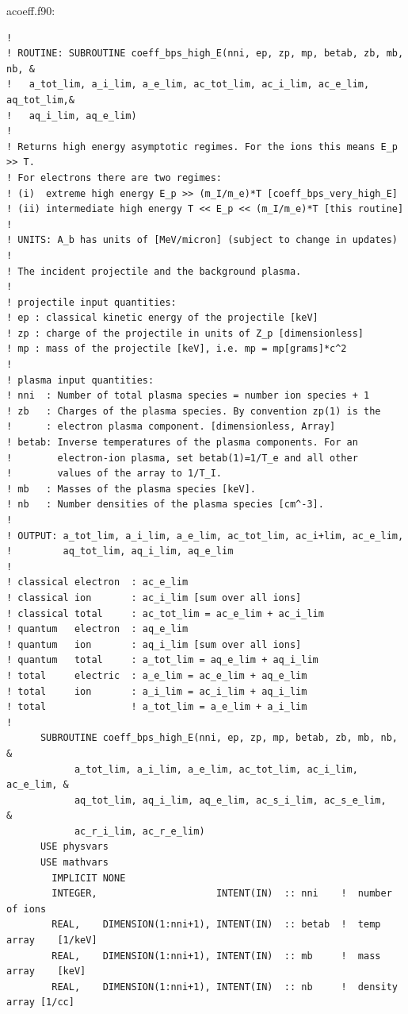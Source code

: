 \documentclass[preprint,12pt,eqsecnum,nofootinbib,amsmath,amssymb]{revtex4}
\begin{document}
\vskip1cm
\noindent
acoeff.f90:
{
\baselineskip 10pt
\begin{verbatim}
! 
! ROUTINE: SUBROUTINE coeff_bps_high_E(nni, ep, zp, mp, betab, zb, mb, nb, &
!   a_tot_lim, a_i_lim, a_e_lim, ac_tot_lim, ac_i_lim, ac_e_lim, aq_tot_lim,&
!   aq_i_lim, aq_e_lim)
!
! Returns high energy asymptotic regimes. For the ions this means E_p >> T.
! For electrons there are two regimes: 
! (i)  extreme high energy E_p >> (m_I/m_e)*T [coeff_bps_very_high_E]
! (ii) intermediate high energy T << E_p << (m_I/m_e)*T [this routine]
!
! UNITS: A_b has units of [MeV/micron] (subject to change in updates)
!
! The incident projectile and the background plasma. 
!
! projectile input quantities:
! ep : classical kinetic energy of the projectile [keV]
! zp : charge of the projectile in units of Z_p [dimensionless]
! mp : mass of the projectile [keV], i.e. mp = mp[grams]*c^2
!
! plasma input quantities:
! nni  : Number of total plasma species = number ion species + 1
! zb   : Charges of the plasma species. By convention zp(1) is the 
!      : electron plasma component. [dimensionless, Array]
! betab: Inverse temperatures of the plasma components. For an
!        electron-ion plasma, set betab(1)=1/T_e and all other
!        values of the array to 1/T_I.
! mb   : Masses of the plasma species [keV]. 
! nb   : Number densities of the plasma species [cm^-3]. 
!
! OUTPUT: a_tot_lim, a_i_lim, a_e_lim, ac_tot_lim, ac_i+lim, ac_e_lim, 
!         aq_tot_lim, aq_i_lim, aq_e_lim
!
! classical electron  : ac_e_lim
! classical ion       : ac_i_lim [sum over all ions]
! classical total     : ac_tot_lim = ac_e_lim + ac_i_lim 
! quantum   electron  : aq_e_lim
! quantum   ion       : aq_i_lim [sum over all ions]
! quantum   total     : a_tot_lim = aq_e_lim + aq_i_lim
! total     electric  : a_e_lim = ac_e_lim + aq_e_lim
! total     ion       : a_i_lim = ac_i_lim + aq_i_lim
! total               ! a_tot_lim = a_e_lim + a_i_lim
!
      SUBROUTINE coeff_bps_high_E(nni, ep, zp, mp, betab, zb, mb, nb,    &
            a_tot_lim, a_i_lim, a_e_lim, ac_tot_lim, ac_i_lim, ac_e_lim, &
            aq_tot_lim, aq_i_lim, aq_e_lim, ac_s_i_lim, ac_s_e_lim,      &
            ac_r_i_lim, ac_r_e_lim)
      USE physvars
      USE mathvars      
        IMPLICIT NONE
        INTEGER,                     INTENT(IN)  :: nni    !  number of ions
        REAL,    DIMENSION(1:nni+1), INTENT(IN)  :: betab  !  temp array    [1/keV]
        REAL,    DIMENSION(1:nni+1), INTENT(IN)  :: mb     !  mass array    [keV]
        REAL,    DIMENSION(1:nni+1), INTENT(IN)  :: nb     !  density array [1/cc]

\end{verbatim}}
\end{document}
